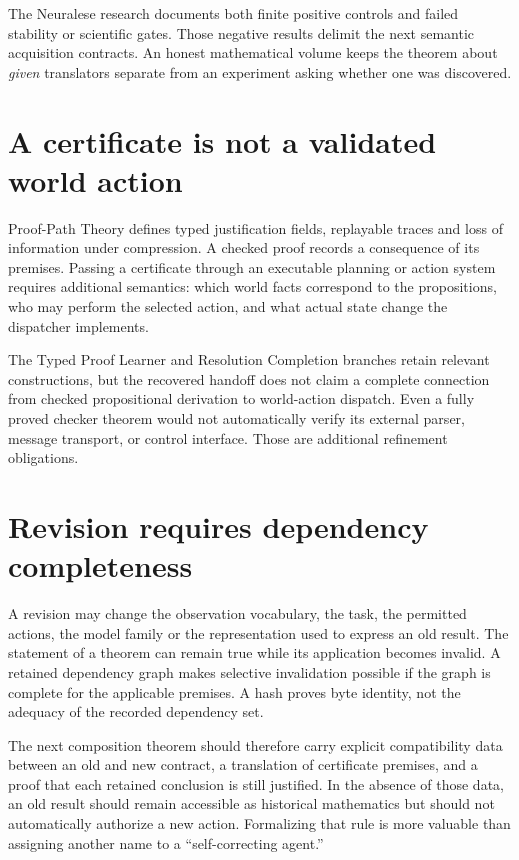 The Neuralese research documents both finite positive controls and failed stability or scientific gates. Those negative results delimit the next semantic acquisition contracts. An honest mathematical volume keeps the theorem about \emph{given} translators separate from an experiment asking whether one was discovered.

\section{A certificate is not a validated world action}
Proof-Path Theory defines typed justification fields, replayable traces and loss of information under compression. A checked proof records a consequence of its premises. Passing a certificate through an executable planning or action system requires additional semantics: which world facts correspond to the propositions, who may perform the selected action, and what actual state change the dispatcher implements.

The Typed Proof Learner and Resolution Completion branches retain relevant constructions, but the recovered handoff does not claim a complete connection from checked propositional derivation to world-action dispatch. Even a fully proved checker theorem would not automatically verify its external parser, message transport, or control interface. Those are additional refinement obligations.

\section{Revision requires dependency completeness}
A revision may change the observation vocabulary, the task, the permitted actions, the model family or the representation used to express an old result. The statement of a theorem can remain true while its application becomes invalid. A retained dependency graph makes selective invalidation possible if the graph is complete for the applicable premises. A hash proves byte identity, not the adequacy of the recorded dependency set.

The next composition theorem should therefore carry explicit compatibility data between an old and new contract, a translation of certificate premises, and a proof that each retained conclusion is still justified. In the absence of those data, an old result should remain accessible as historical mathematics but should not automatically authorize a new action. Formalizing that rule is more valuable than assigning another name to a ``self-correcting agent.''

